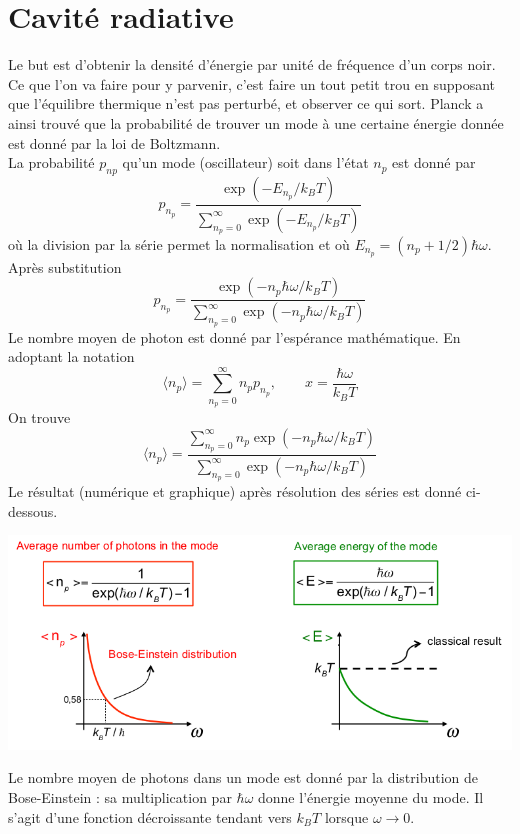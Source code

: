 	\section{Cavité radiative}
	Le but est d'obtenir la densité d'énergie par unité de fréquence d'un corps noir. Ce que l'on va faire pour 
	y parvenir, c'est faire un tout petit trou en supposant que l'équilibre thermique n'est pas perturbé, et 
	observer ce qui sort. Planck a ainsi trouvé que la probabilité de trouver un mode à une certaine énergie 
	donnée est donné par la loi de Boltzmann. \\
	La probabilité $p_{np}$ qu'un mode (oscillateur) soit dans l'état $n_p$ est donné par
	\begin{equation}
	p_{n_p} = \dfrac{\exp(-E_{n_p}/k_BT)}{\sum_{n_p=0}^\infty \exp(-E_{n_p}/k_BT)}
	\end{equation}
	où la division par la série permet la normalisation et où $E_{n_p} = (n_p+1/2)\hbar\omega$. Après 
	substitution
	\begin{equation}
	p_{n_p} = \dfrac{\exp(-n_p\hbar\omega/k_BT)}{\sum_{n_p=0}^\infty \exp(-n_p\hbar\omega/k_BT)}
	\end{equation}
	Le nombre moyen de photon est donné par l'espérance mathématique. En adoptant la notation
	\begin{equation}
	\langle n_p\rangle = \sum_{n_p=0}^\infty n_pp_{n_p},\qquad x=\dfrac{\hbar\omega}{k_BT}
	\end{equation}
	On trouve
	\begin{equation}
	\langle n_p\rangle = \dfrac{\sum_{n_p=0}^\infty n_p\exp(-n_p\hbar\omega/k_BT)}{\sum_{n_p=0}^\infty \exp(-n_p\hbar\omega/k_BT)}
	\end{equation}
	Le résultat (numérique et graphique) après résolution des séries est donné ci-dessous.\newpage
	\begin{center}
	\includegraphics[scale=0.55]{ch2/image8.png}
	\end{center}
	Le nombre moyen de photons dans un mode est donné par la distribution de Bose-Einstein : sa multiplication 
	par $\hbar\omega$ donne l'énergie moyenne du mode. Il s'agit d'une fonction décroissante tendant vers 
	$k_BT$ lorsque $\omega\to0$.\\
	
